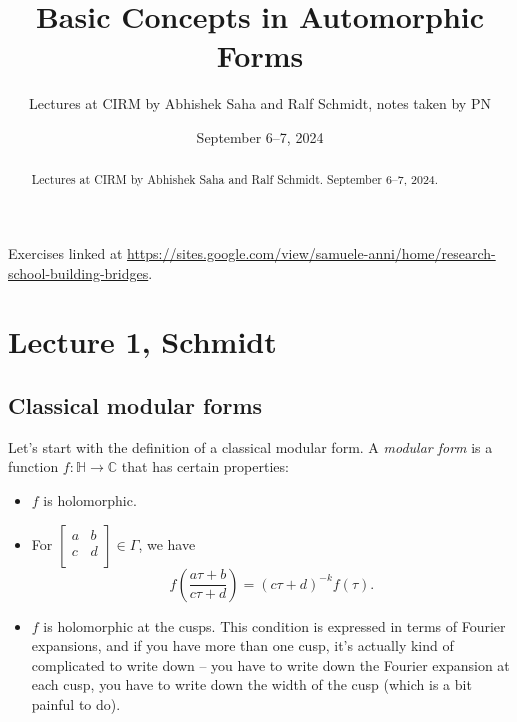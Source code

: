 \documentclass[reqno]{amsart} 
\begin{document}
\title{Basic Concepts in Automorphic Forms}

\author{Lectures at CIRM by Abhishek Saha and Ralf Schmidt, notes taken by PN}

\date{September 6--7, 2024}

\maketitle

\begin{abstract}
  Lectures at CIRM by Abhishek Saha and Ralf Schmidt.  September 6--7, 2024.
\end{abstract}

Exercises linked at \url{https://sites.google.com/view/samuele-anni/home/research-school-building-bridges}.

\section{Lecture 1, Schmidt}

\subsection{Classical modular forms}

Let's start with the definition of a classical modular form.  A \emph{modular form} is a function $f : \mathbb{H} \rightarrow \mathbb{C}$ that has certain properties:
\begin{itemize}
\item $f$ is holomorphic.
\item For $
  \begin{bmatrix}
    a    & b \\
    c & d \\
  \end{bmatrix} \in \Gamma$, we have
  \begin{equation}\label{eq:cnog0kttte}
    f\left( \frac{a \tau + b}{c \tau + d}\right)
    =(c \tau + d)^{- k}
    f(\tau).    
  \end{equation}
\item $f$ is holomorphic at the cusps.  This condition is expressed in terms of Fourier expansions, and if you have more than one cusp, it's actually kind of complicated to write down -- you have to write down the Fourier expansion at each cusp, you have to write down the width of the cusp (which is a bit painful to do).
\end{itemize}
\end{document}

